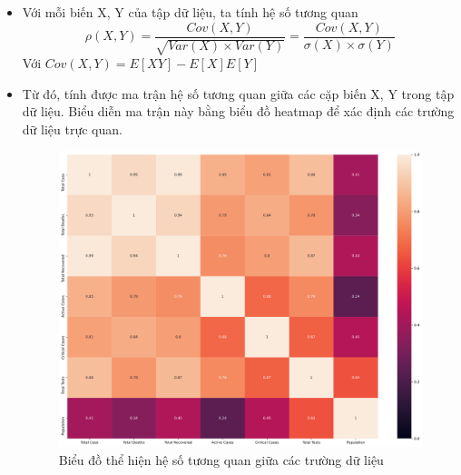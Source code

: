 \documentclass[a4paper, 12pt]{article}
\begin{document}
    \begin{itemize}
        \item Với mỗi biến X, Y của tập dữ liệu, ta tính hệ số tương quan 
        $$\rho(X, Y) = \frac{Cov(X, Y)}{\sqrt{Var(X)\times Var(Y)}} = \frac{Cov(X, Y)}{\sigma(X)\times \sigma(Y)}$$
        Với $Cov(X,Y) = E[XY] - E[X]E[Y]$

        \item Từ đó, tính được ma trận hệ số tương quan giữa các cặp biến X, Y trong tập dữ liệu. Biểu diễn ma trận này bằng biểu đồ heatmap để xác định các trường dữ liệu trực quan.
        \begin{figure}[H]
            \begin{center}
                \includegraphics[scale = 0.3]{img/heatmap.png}
                \caption{Biểu đồ thể hiện hệ số tương quan giữa các trường dữ liệu}
            \end{center}
        \end{figure}


\end{itemize}
\end{document}
